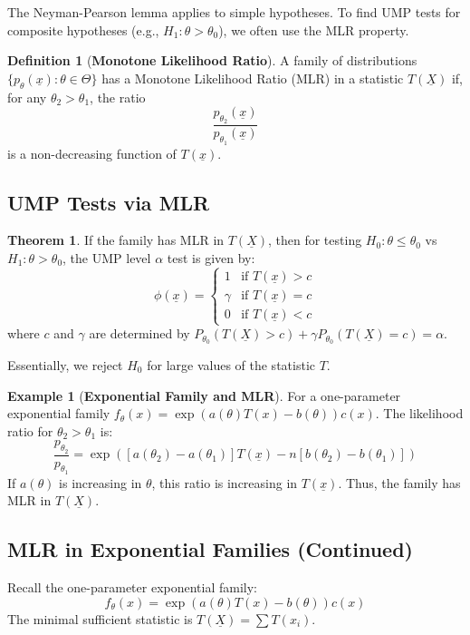 \documentclass[12pt, a4paper]{article}
\theoremstyle{definition}
\newtheorem{definition}{Definition}
\newtheorem{example}{Example}
\newtheorem{theorem}{Theorem}
\newcommand{\xvec}{\underline{x}}
\newcommand{\Xvec}{\underline{X}}
\begin{document}
The Neyman-Pearson lemma applies to simple hypotheses. To find UMP tests for composite hypotheses (e.g., $H_1: \theta > \theta_0$), we often use the MLR property.

\begin{definition}[\textbf{Monotone Likelihood Ratio}]
A family of distributions $\{p_\theta(\xvec) : \theta \in \Theta\}$ has a Monotone Likelihood Ratio (MLR) in a statistic $T(\Xvec)$ if, for any $\theta_2 > \theta_1$, the ratio
$$ \frac{p_{\theta_2}(\xvec)}{p_{\theta_1}(\xvec)} $$
is a non-decreasing function of $T(\xvec)$.
\end{definition}

\subsection{UMP Tests via MLR}
\begin{theorem}
If the family has MLR in $T(\Xvec)$, then for testing $H_0: \theta \le \theta_0$ vs $H_1: \theta > \theta_0$, the UMP level $\alpha$ test is given by:
$$ 
\phi(\xvec) = 
\begin{cases} 
1 & \text{if } T(\xvec) > c \\
\gamma & \text{if } T(\xvec) = c \\
0 & \text{if } T(\xvec) < c
\end{cases}
$$
where $c$ and $\gamma$ are determined by $P_{\theta_0}(T(\Xvec) > c) + \gamma P_{\theta_0}(T(\Xvec) = c) = \alpha$.
\end{theorem}
Essentially, we reject $H_0$ for large values of the statistic $T$.

\begin{example}[\textbf{Exponential Family and MLR}]
For a one-parameter exponential family $f_\theta(x) = \exp(a(\theta)T(x) - b(\theta))c(x)$.
The likelihood ratio for $\theta_2 > \theta_1$ is:
$$ \frac{p_{\theta_2}}{p_{\theta_1}} = \exp\left( [a(\theta_2) - a(\theta_1)] T(\xvec) - n[b(\theta_2) - b(\theta_1)] \right) $$
If $a(\theta)$ is increasing in $\theta$, this ratio is increasing in $T(\xvec)$.
Thus, the family has MLR in $T(\Xvec)$.
\end{example}

\subsection{MLR in Exponential Families (Continued)}
Recall the one-parameter exponential family:
$$ f_\theta(x) = \exp(a(\theta)T(x) - b(\theta))c(x) $$
The minimal sufficient statistic is $T(\Xvec) = \sum T(x_i)$.
\end{document}

